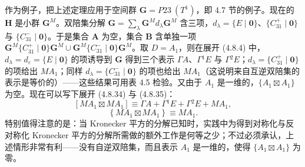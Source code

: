 作为例子，把上述定理应用于空间群 $\mathbf{G} = P23\ (T^{1})$，即 4.7 节的例子。现在的 $\mathbf{H}$ 是小群 $\mathbf{G}^{M}$。双陪集分解 $\mathbf{G} = \sum_{\lambda}\mathbf{G}^{M}d_{\lambda}\mathbf{G}^{M}$ 含三项，$d_{\lambda} = \{E \mid \mathbf{0}\}$、$\{C^{+}_{31} \mid \mathbf{0}\}$ 与 $\{C^{-}_{31} \mid \mathbf{0}\}$。于是集合 $\mathbf{A}$ 为空，集合 $\mathbf{B}$ 含单独一项 $\mathbf{G}^{M}\{C^{+}_{31} \mid \mathbf{0}\}\mathbf{G}^{M} \cup \mathbf{G}^{M}\{C^{-}_{31} \mid \mathbf{0}\}\mathbf{G}^{M}$。取 $D = A_{1}$，则在展开 (4.8.4) 中，$d_{\lambda} = d_{\varepsilon} = \{E \mid \mathbf{0}\}$ 的项诱导到 $\mathbf{G}$ 得到三个表示 $\Gamma A$、$\Gamma{}^{1}E$ 与 $\Gamma{}^{2}E$；$d_{\lambda} = \{C^{+}_{31} \mid \mathbf{0}\}$ 的项给出 $MA_{1}$；同样 $d_{\lambda} = \{C^{-}_{31} \mid \mathbf{0}\}$ 的项也给出 $MA_{1}$（这说明来自互逆双陪集的表示是等价的）——这些结果可用表 4.5 检验。又由于 $A_{1}$ 是一维的，$\{A_{1} \boxtimes A_{1}\}$ 为空。现在可以写下展开 (4.8.34) 与 (4.8.35)：
\begin{equation*}
\left[MA_{1} \boxtimes MA_{1}\right] \equiv \Gamma A + \Gamma{}^{1}E + \Gamma{}^{2}E + MA_{1},
\tag{4.8.36}
\end{equation*}
\begin{equation*}
\left\{MA_{1} \boxtimes MA_{1}\right\} \equiv MA_{1}.
\tag{4.8.37}
\end{equation*}
特别值得注意的是：当 Kronecker 平方的分解已知时，实践中为得到对称化与反对称化 Kronecker 平方的分解所需做的额外工作是何等之少；不过必须承认，上述情形非常有利——没有自逆双陪集，而且表示 $A_{1}$ 是一维的，使得 $\{A_{1} \boxtimes A_{1}\}$ 为零。
